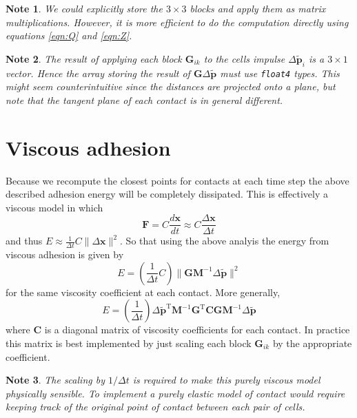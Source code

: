 \documentclass{report}
\renewcommand{\vec}[1]{\mathbf{#1}}
\newcommand{\mat}{\mathbf}
\newcommand{\invmat}[1]{\mat{#1}^{-1}}
\newtheorem*{note}{Note}
\begin{document}
\begin{note}
We could explicitly store the $3\times3$ blocks and apply them as matrix
multiplications. However, it is more efficient to do the computation directly
using equations \ref{eqn:Q} and \ref{eqn:Z}.
\end{note}

\begin{note}
The result of applying each block $\mat{G}_{ik}$ to the cells impulse $\Delta
\tilde{\vec{p}}_i$ is a $3\times1$ vector. Hence the array storing the result of
$\mat{G}\Delta \tilde{\vec{p}}$ must use \texttt{float4} types. This might seem
counterintuitive since the distances are projected onto a plane, but note that
the tangent plane of each contact is in general different.
\end{note}

\section{Viscous adhesion}
Because we recompute the closest points for contacts at each time step the above
described adhesion energy will be completely dissipated. This is effectively a
viscous model in which
\begin{equation*}
\vec{F} = C \frac{d\vec{x}}{dt} \approx C \frac{\Delta \vec{x}}{\Delta t}
\end{equation*}
and thus $E \approx \frac{1}{\Delta t}C\|\Delta \vec{x}\|^2$. So that using the
above analyis the energy from viscous adhesion is given by
\begin{equation*}
E = \left(\frac{1}{\Delta t}C \right) \|\mat{G}\invmat{M}\Delta \tilde{\vec{p}}\|^2
\end{equation*}
for the same viscosity coefficient at each contact. More generally,
\begin{equation*}
E = \left(\frac{1}{\Delta t} \right) 
\Delta \tilde{\vec{p}}^\textrm{T}\invmat{M}\mat{G}^\textrm{T}\mat{C}\mat{G}\invmat{M}\Delta \tilde{\vec{p}}
\end{equation*}
where $\mat{C}$ is a diagonal matrix of viscosity coefficients for each contact.
In practice this matrix is best implemented by just scaling each block
$\mat{G}_{ik}$ by the appropriate coefficient.

\begin{note}
The scaling by $1/\Delta t$ is required to make this purely viscous model physically sensible.
To implement a purely elastic model of contact would require keeping track of
the original point of contact between each pair of cells.
\end{note}
\end{document}
